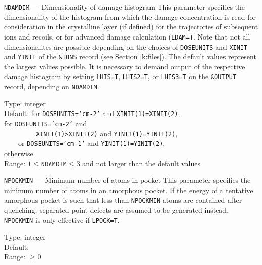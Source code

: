 \begin{keydescription}{\texttt{NDAMDIM} --- Dimensionality of damage histogram}
%
  This parameter specifies the dimensionality of the histogram from which
  the damage concentration is read for consideration in the crystalline 
  layer (if defined) for the trajectories of subsequent ions and recoils, or
  for advanced damage calculation (\texttt{LDAM=T}.
  Note that not all dimensionalites are possible depending on the choices 
  of \texttt{DOSEUNITS} and \texttt{XINIT} and \texttt{YINIT} of the
  \texttt{\&IONS} record (see Section \ref{k:files}). The default values represent the
  largest values possible. It is necessary to demand output of the respective
  damage histogram by setting \texttt{LHIS=T}, \texttt{LHIS2=T}, or
  \texttt{LHIS3=T} on the \texttt{\&OUTPUT} record, depending on
  \texttt{NDAMDIM}.
  \begin{keytab}
    Type:    \> integer \\
    Default:  for \texttt{DOSEUNITS='cm-2'} and 
                      \texttt{XINIT(1)=XINIT(2)}, \\
              for \texttt{DOSEUNITS='cm-2'} and \\
             \> \ \ \ \ \ \ \ \ \ \texttt{XINIT(1)>XINIT(2)} and 
                        \texttt{YINIT(1)=YINIT(2)}, \\
            \> \ \ \ \ or \texttt{DOSEUNITS='cm-1'} and
                      \texttt{YINIT(1)=YINIT(2)}, \\
              otherwise \\
    Range:   \> $1 \le \texttt{NDAMDIM} \le 3$ and not larger than the default
                values
  \end{keytab}
\end{keydescription}

\begin{keydescription}{\texttt{NPOCKMIN} --- Minimum number of atoms
    in pocket}
%
  This parameter specifies the minimum number of atoms in an amorphous
  pocket.  If the energy of a tentative amorphous pocket is such that
  less than \texttt{NPOCKMIN} atoms are contained after quenching,
  separated point defects are assumed to be generated instead.
  \texttt{NPOCKMIN} is only effective if \texttt{LPOCK=T}.
  \begin{keytab}
     Type:    \> integer \\
     Default:  \\
     Range:   \> $\ge 0$
  \end{keytab}
\end{keydescription}

